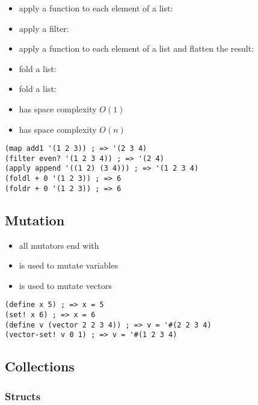 \documentclass[a4paper,landscape,10pt]{article}
\begin{document}
\begin{multicols*}{2}
  \begin{itemize}
    \item apply a function to each element of a list: 
    \item apply a filter: 
    \item apply a function to each element of a list and flatten the result: 
    \item fold a list: 
    \item fold a list: 
    \item {} has space complexity \(O(1)\)
    \item {} has space complexity \(O(n)\)
  \end{itemize}

  \begin{lstlisting}[language=Racket]
(map add1 '(1 2 3)) ; => '(2 3 4)
(filter even? '(1 2 3 4)) ; => '(2 4)
(apply append '((1 2) (3 4))) ; => '(1 2 3 4)
(foldl + 0 '(1 2 3)) ; => 6
(foldr + 0 '(1 2 3)) ; => 6
\end{lstlisting}

  \subsection{Mutation}

  \begin{itemize}
    \item all mutators end with \iracket{\!}
    \item {} is used to mutate variables
    \item {} is used to mutate vectors
  \end{itemize}

  \begin{lstlisting}[language=Racket]
(define x 5) ; => x = 5
(set! x 6) ; => x = 6
(define v (vector 2 2 3 4)) ; => v = '#(2 2 3 4)
(vector-set! v 0 1) ; => v = '#(1 2 3 4)
\end{lstlisting}

  \subsection{Collections}

  \subsubsection{Structs}


\end{multicols*}
\end{document}
